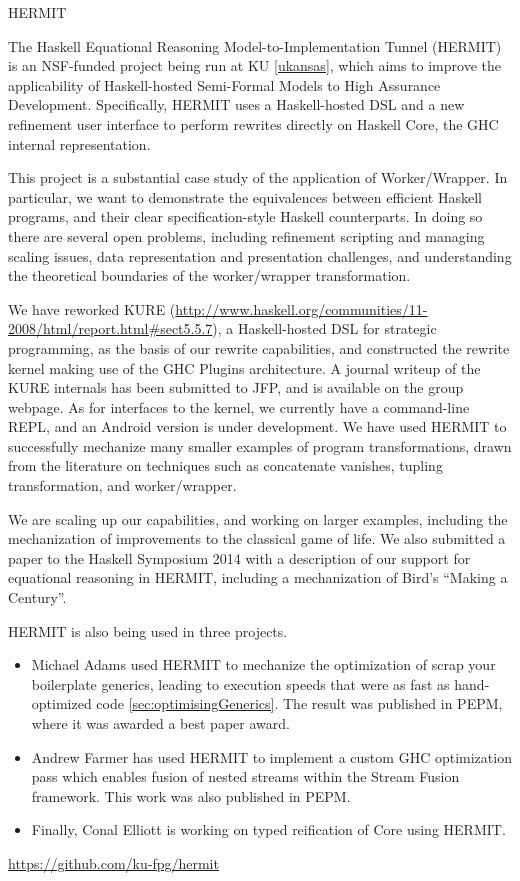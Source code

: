 \begin{hcarentry}{HERMIT}
\label{HERMIT}
\makeheader

The Haskell Equational Reasoning Model-to-Implementation Tunnel
(HERMIT) is an NSF-funded project being run at KU \cref{ukansas}, which aims to improve the
applicability of Haskell-hosted Semi-Formal Models to High Assurance Development.
Specifically, HERMIT uses a Haskell-hosted DSL
and a new refinement user interface to perform rewrites directly on Haskell Core, the GHC internal representation.

This project is a substantial case study of the application of
Worker/Wrapper. In particular, we want to
demonstrate the equivalences between efficient Haskell programs, and
their clear specification-style Haskell counterparts. In doing so
there are several open problems, including refinement scripting and
managing scaling issues, data representation and presentation
challenges, and understanding the theoretical boundaries of the
worker/wrapper transformation.

We have reworked KURE (\url{http://www.haskell.org/communities/11-2008/html/report.html#sect5.5.7}),
a Haskell-hosted DSL for strategic programming, as the basis of our rewrite capabilities,
and constructed the rewrite kernel making use of the GHC Plugins architecture.
A journal writeup of the KURE internals has been submitted to JFP, and is available
on the group webpage.
As for interfaces to the kernel,
we currently have a command-line REPL, and an Android version is under development.
We have used HERMIT to successfully mechanize many smaller examples of program transformations,
drawn from the literature on techniques such as concatenate vanishes, tupling transformation, and worker/wrapper.

We are scaling up our capabilities, and working on larger examples,
including the mechanization of improvements to the classical game of life.
We also submitted a paper to the Haskell Symposium 2014 with a description of
our support for equational reasoning in HERMIT, including a mechanization
of Bird's ``Making a Century''.

HERMIT is also being used in three projects.
\begin{itemize}
\item Michael Adams used HERMIT to mechanize the optimization of scrap
  your boilerplate generics, leading to execution speeds that were as
  fast as hand-optimized code \cref{sec:optimisingGenerics}. The
  result was published in PEPM, where it was awarded a best paper
  award.
\item Andrew Farmer has used HERMIT to implement a custom GHC
  optimization pass which enables fusion of nested streams within the
  Stream Fusion framework.  This work was also published in PEPM.
\item Finally, Conal Elliott is working on typed reification of Core using HERMIT.
\end{itemize}

\FurtherReading
  \url{https://github.com/ku-fpg/hermit}
\end{hcarentry}
